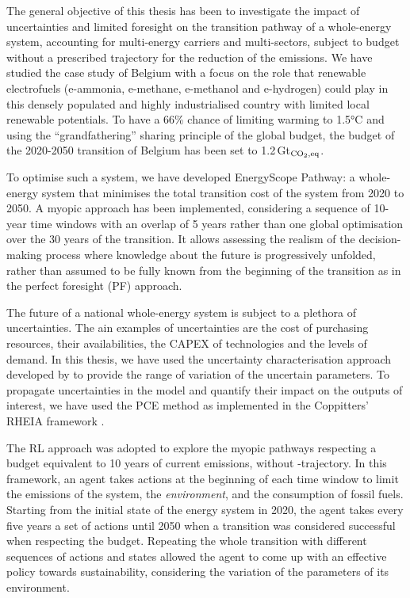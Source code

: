 

The general objective of this thesis has been to investigate the impact of uncertainties and limited foresight on the transition pathway of a whole-energy system, accounting for multi-energy carriers and multi-sectors, subject to  budget without a prescribed trajectory for the reduction of the emissions.  We have studied the case study of Belgium with a focus on the role that renewable electrofuels (e-ammonia, e-methane, e-methanol and e-hydrogen) could play in this densely populated and highly industrialised country with limited local renewable potentials. To have a 66\% chance of limiting warming to 1.5°C and using the ``grandfathering'' sharing principle of the global budget, the  budget of the 2020-2050 transition of Belgium has been set to 1.2\,Gt$_{\ce{CO2},\text{eq}}$.

To optimise such a system, we have developed EnergyScope Pathway: a whole-energy system that minimises the total transition cost of the system from 2020 to 2050. A myopic approach has been implemented, considering a sequence of 10-year time windows with an overlap of 5 years rather than one global optimisation over the 30 years of the transition. It allows assessing the realism of the decision-making process where knowledge about the future is progressively unfolded, rather than assumed to be fully known from the beginning of the transition as in the perfect foresight (PF) approach. 

The future of a national whole-energy system is subject to a plethora of uncertainties. The ain examples of uncertainties are the cost of purchasing resources, their availabilities, the \acrfull{CAPEX} of technologies and the levels of demand. In this thesis, we have used the uncertainty characterisation approach developed by \citet{moret2016strategic} to provide the range of variation of the uncertain parameters. To propagate uncertainties in the model and quantify their impact on the outputs of interest, we have used the \acrfull{PCE} method as implemented in the Coppitters' RHEIA framework \cite{coppittersthesis}.

The \acrfull{RL} approach was adopted to explore the myopic pathways respecting a  budget equivalent to 10 years of current emissions, without -trajectory. In this framework, an agent takes actions at the beginning of each time window to limit the emissions of the system, the \textit{environment}, and the consumption of fossil fuels. Starting from the initial state of the energy system in 2020, the agent takes every five years a set of actions until 2050 when a transition was considered successful when respecting the  budget. Repeating the whole transition with different sequences of actions and states allowed the agent to come up with an effective policy towards sustainability, considering the variation of the parameters of its environment.

